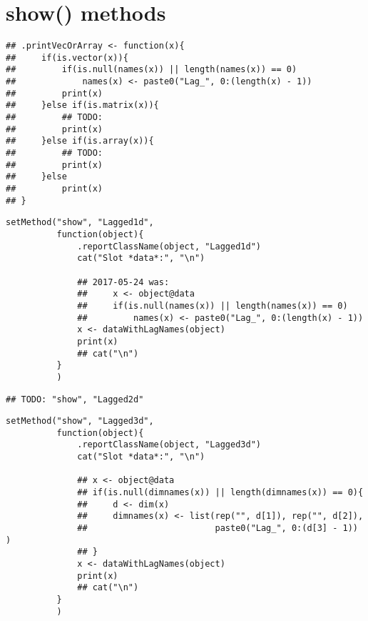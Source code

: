 \documentclass[11pt,a4paper]{article}
\begin{document}
\section{show() methods}
\label{sec:org58bfcbf}

\begin{verbatim}
## .printVecOrArray <- function(x){
##     if(is.vector(x)){
##         if(is.null(names(x)) || length(names(x)) == 0)
##             names(x) <- paste0("Lag_", 0:(length(x) - 1))
##         print(x)
##     }else if(is.matrix(x)){
##         ## TODO:
##         print(x)
##     }else if(is.array(x)){
##         ## TODO:
##         print(x)
##     }else
##         print(x)
## }
\end{verbatim}


\begin{verbatim}
setMethod("show", "Lagged1d",
          function(object){
              .reportClassName(object, "Lagged1d")
              cat("Slot *data*:", "\n")

              ## 2017-05-24 was:
              ##     x <- object@data
              ##     if(is.null(names(x)) || length(names(x)) == 0)
              ##         names(x) <- paste0("Lag_", 0:(length(x) - 1))
              x <- dataWithLagNames(object)
              print(x)
              ## cat("\n")
          }
          )
\end{verbatim}

\begin{verbatim}
## TODO: "show", "Lagged2d"
\end{verbatim}


\begin{verbatim}
setMethod("show", "Lagged3d",
          function(object){
              .reportClassName(object, "Lagged3d")
              cat("Slot *data*:", "\n")

              ## x <- object@data
              ## if(is.null(dimnames(x)) || length(dimnames(x)) == 0){
              ##     d <- dim(x)
              ##     dimnames(x) <- list(rep("", d[1]), rep("", d[2]),
              ##                         paste0("Lag_", 0:(d[3] - 1)) )
              ## }
              x <- dataWithLagNames(object)
              print(x)
              ## cat("\n")
          }
          )
\end{verbatim}
\end{document}
